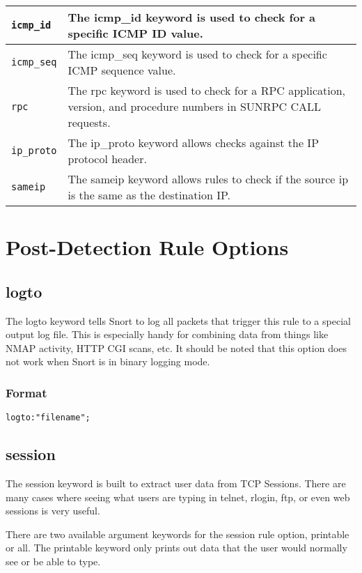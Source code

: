 \documentclass[english]{report}
\begin{document}
\begin{center}
\begin{longtable}{| p{1in} | p{5in} |}
\hline
\texttt{icmp\_id} & The icmp\_id keyword is used to check for a specific ICMP ID value. \\
\hline
\texttt{icmp\_seq} & The icmp\_seq keyword is used to check for a specific ICMP sequence
value. \\
\hline
\texttt{rpc} & The rpc keyword is used to check for a RPC application, version, and
procedure numbers in SUNRPC CALL requests. \\
\hline
\texttt{ip\_proto} & The ip\_proto keyword allows checks against the IP protocol
header. \\
\hline
\texttt{sameip} & The sameip keyword allows rules to check if the source ip is the
same as the destination IP. \\
\hline
\end{longtable}
\end{center}

\section{Post-Detection Rule Options}
\subsection{logto}

The logto keyword tells Snort to log all packets that trigger this rule to a
special output log file. This is especially handy for combining data from
things like NMAP activity, HTTP CGI scans, etc. It should be noted that this
option does not work when Snort is in binary logging mode.

\subsubsection{Format}

\begin{verbatim}
logto:"filename";
\end{verbatim}

\subsection{session}

The session keyword is built to extract user data from TCP Sessions.  There are
many cases where seeing what users are typing in telnet, rlogin, ftp, or even
web sessions is very useful. 

There are two available argument keywords for the session rule option,
printable or all. The printable keyword only prints out data that the user
would normally see or be able to type. 
\end{document}
